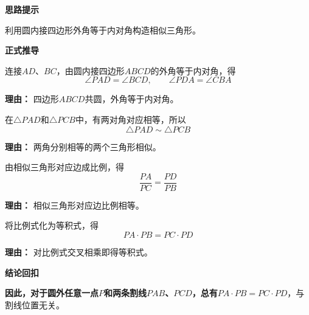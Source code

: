 \begin{proofbox}
	\textbf{\textcolor{CProof}{思路提示}}

	利用圆内接四边形外角等于内对角构造相似三角形。

	\medskip
	\textbf{\textcolor{CProof}{正式推导}}
	\begin{description}[style=nextline, leftmargin=2.8em, labelsep=0.5em, itemsep=0.55em]
		\item[\textbf{步骤一（角等构造）：}] 连接$AD$、$BC$，由圆内接四边形$ABCD$的外角等于内对角，得
			\[
				\angle PAD = \angle BCD,
				\qquad
				\angle PDA = \angle CBA
			\]
			\par\textbf{理由：} 四边形$ABCD$共圆，外角等于内对角。
		\item[\textbf{步骤二（相似证明）：}] 在$\triangle PAD$和$\triangle PCB$中，有两对角对应相等，所以
			\[
				\triangle PAD \sim \triangle PCB
			\]
			\par\textbf{理由：} 两角分别相等的两个三角形相似。
		\item[\textbf{步骤三（比例转换）：}] 由相似三角形对应边成比例，得
			\[
				\frac{PA}{PC} = \frac{PD}{PB}
			\]
			\par\textbf{理由：} 相似三角形对应边比例相等。
		\item[\textbf{步骤四（等积得出）：}] 将比例式化为等积式，得
			\[
				PA \cdot PB = PC \cdot PD
			\]
			\par\textbf{理由：} 对比例式交叉相乘即得等积式。
	\end{description}

	\medskip
	\textbf{\textcolor{CProof}{结论回扣}}

	\textbf{因此，对于圆外任意一点$P$和两条割线$PAB$、$PCD$，总有}$PA\cdot PB = PC\cdot PD$，与割线位置无关。
\end{proofbox}
